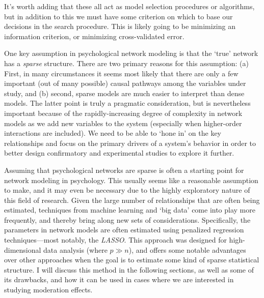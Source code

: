 It's worth adding that these all act as model selection procedures or algorithms, but in addition to this we must have some criterion on which to base our decisions in the search procedure. This is likely going to be minimizing an information criterion, or minimizing cross-validated error.

One key assumption in psychological network modeling is that the `true' network has a \textit{sparse} structure. There are two primary reasons for this assumption: (a) First, in many circumstances it seems most likely that there are only a few important (out of many possible) causal pathways among the variables under study, and (b) second, sparse models are much easier to interpret than dense models. The latter point is truly a pragmatic consideration, but is nevertheless important because of the rapidly-increasing degree of complexity in network models as we add new variables to the system (especially when higher-order interactions are included). We need to be able to `hone in' on the key relationships and focus on the primary drivers of a system's behavior in order to better design confirmatory and experimental studies to explore it further. 

Assuming that psychological networks are sparse is often a starting point for network modeling in psychology. This usually seems like a reasonable assumption to make, and it may even be necessary due to the highly exploratory nature of this field of research. Given the large number of relationships that are often being estimated, techniques from machine learning and `big data' come into play more frequently, and thereby bring along new sets of considerations. Specifically, the parameters in network models are often estimated using penalized regression techniques---most notably, the \textit{LASSO}. This approach was designed for high-dimensional data analysis (where $p \gg n$), and offers some notable advantages over other approaches when the goal is to estimate some kind of sparse statistical structure. I will discuss this method in the following sections, as well as some of its drawbacks, and how it can be used in cases where we are interested in studying moderation effects.

